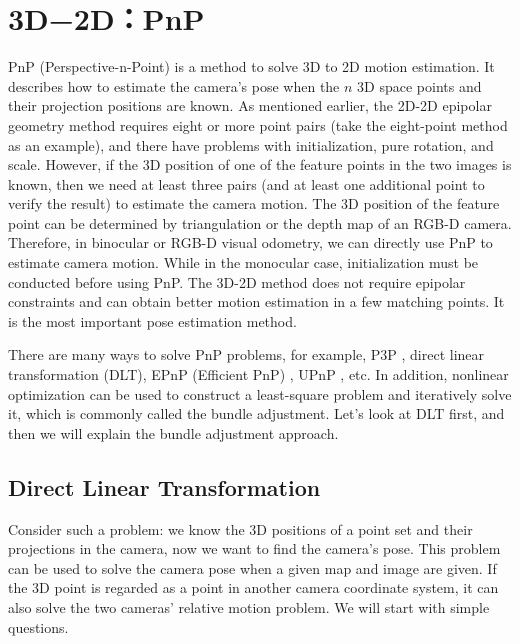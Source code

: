 \section{3D−2D：PnP}
PnP (Perspective-n-Point) is a method to solve 3D to 2D motion estimation. It describes how to estimate the camera's pose when the $n$ 3D space points and their projection positions are known. As mentioned earlier, the 2D-2D epipolar geometry method requires eight or more point pairs (take the eight-point method as an example), and there have problems with initialization, pure rotation, and scale. However, if the 3D position of one of the feature points in the two images is known, then we need at least three pairs (and at least one additional point to verify the result) to estimate the camera motion. The 3D position of the feature point can be determined by triangulation or the depth map of an RGB-D camera. Therefore, in binocular or RGB-D visual odometry, we can directly use PnP to estimate camera motion. While in the monocular case, initialization must be conducted before using PnP. The 3D-2D method does not require epipolar constraints and can obtain better motion estimation in a few matching points. It is the most important pose estimation method.

There are many ways to solve PnP problems, for example, P3P {\cite{GaoHouTangEtAl2003}}, direct linear transformation (DLT), EPnP (Efficient PnP) {\cite{LepetitMoreno-NoguerFua2008 }}, UPnP {\cite{Penate-SanchezAndrade-CettoMoreno-Noguer2013}}, etc. In addition, nonlinear optimization can be used to construct a least-square problem and iteratively solve it, which is commonly called the bundle adjustment. Let's look at DLT first, and then we will explain the bundle adjustment approach.

\subsection{Direct Linear Transformation}
Consider such a problem: we know the 3D positions of a point set and their projections in the camera, now we want to find the camera's pose. This problem can be used to solve the camera pose when a given map and image are given. If the 3D point is regarded as a point in another camera coordinate system, it can also solve the two cameras' relative motion problem. We will start with simple questions.

